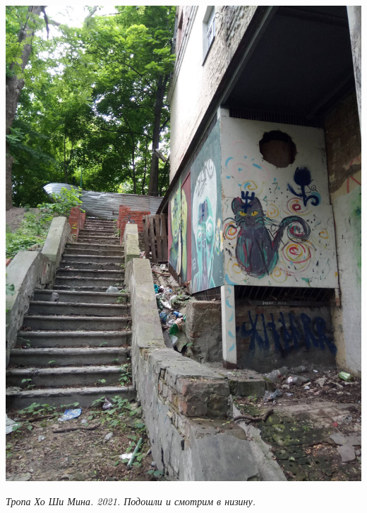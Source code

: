 \begin{center}
\includegraphics[width=\linewidth]{rpix/IMG_20210601_135253.jpg}

\textit{Тропа Хо Ши Мина. 2021. Подошли и смотрим в низину.}
\end{center}



